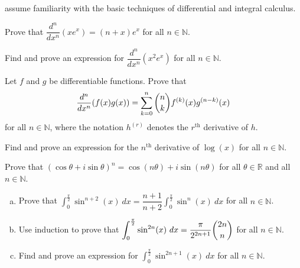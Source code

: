  assume familiarity with the basic techniques of differential and integral calculus.

\begin{chapex}
\label{cqCalculusBegin}
Prove that $\dfrac{d^n}{dx^n}(xe^x) = (n+x)e^x$ for all $n \in \mathbb{N}$.
\end{chapex}

\begin{chapex}
Find and prove an expression for $\dfrac{d^n}{dx^n}(x^2e^x)$ for all $n \in \mathbb{N}$.
\end{chapex}

\begin{chapex}
Let $f$ and $g$ be differentiable functions. Prove that
\[ \dfrac{d^n}{dx^n}(f(x)g(x)) = \sum_{k=0}^n \dbinom{n}{k} f^{(k)}(x) g^{(n-k)}(x) \]
for all $n \in \mathbb{N}$, where the notation $h^{(r)}$ denotes the $r^{\text{th}}$ derivative of $h$.
\end{chapex}

\begin{chapex}
Find and prove an expression for the $n^{\text{th}}$ derivative of $\log(x)$ for all $n \in \mathbb{N}$.
\end{chapex}

\begin{chapex}
Prove that $(\cos \theta + i \sin \theta)^n = \cos (n\theta) + i \sin (n\theta)$ for all $\theta \in \mathbb{R}$ and all $n \in \mathbb{N}$.
\end{chapex}

\begin{chapex}
\label{cqCalculusEnd}
\begin{enumerate}[(a)]
\item Prove that $\displaystyle \int_0^{\frac{\pi}{2}} \sin^{n+2}(x)~dx = \dfrac{n+1}{n+2} \int_0^{\frac{\pi}{2}} \sin^n(x)~dx$ for all $n \in \mathbb{N}$.
\item Use induction to prove that $\displaystyle \int_0^{\frac{\pi}{2}} \sin^{2n}(x)~dx = \dfrac{\pi}{2^{2n+1}} \dbinom{2n}{n}$ for all $n \in \mathbb{N}$.
\item Find and prove an expression for $\displaystyle \int_0^{\frac{\pi}{2}} \sin^{2n+1}(x)~dx$ for all $n \in \mathbb{N}$.
\end{enumerate}
\end{chapex}

